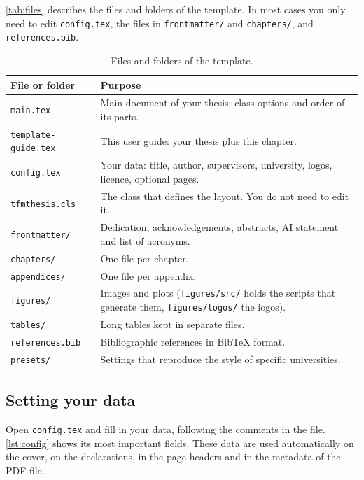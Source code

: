 \autoref{tab:files} describes the files and folders of the template. In most cases you only
need to edit \texttt{config.tex}, the files in \texttt{frontmatter/} and \texttt{chapters/},
and \texttt{references.bib}.

\begin{table}[ht!]
  \centering
  \small
  \caption{Files and folders of the template.}
  \label{tab:files}
  \begin{tabular}{@{}l p{10.6cm}@{}}
    \toprule
    \textbf{File or folder} & \textbf{Purpose} \\
    \midrule
    \texttt{main.tex}           & \raggedright Main document of your thesis: class options and order of
                                  its parts. \tabularnewline
    \texttt{template-guide.tex} & \raggedright This user guide: your thesis plus this chapter. \tabularnewline
    \texttt{config.tex}         & \raggedright Your data: title, author, supervisors, university, logos,
                                  licence, optional pages. \tabularnewline
    \texttt{tfmthesis.cls}      & \raggedright The class that defines the layout. You do not need to
                                  edit it. \tabularnewline
    \texttt{frontmatter/}       & \raggedright Dedication, acknowledgements, abstracts, AI statement and
                                  list of acronyms. \tabularnewline
    \texttt{chapters/}          & \raggedright One file per chapter. \tabularnewline
    \texttt{appendices/}        & \raggedright One file per appendix. \tabularnewline
    \texttt{figures/}           & \raggedright Images and plots (\texttt{figures/src/} holds the scripts
                                  that generate them, \texttt{figures/logos/} the logos). \tabularnewline
    \texttt{tables/}            & \raggedright Long tables kept in separate files. \tabularnewline
    \texttt{references.bib}     & \raggedright Bibliographic references in BibTeX format. \tabularnewline
    \texttt{presets/}           & \raggedright Settings that reproduce the style of specific
                                  universities. \tabularnewline
    \bottomrule
  \end{tabular}
\end{table}

\subsection{Setting your data}\label{sec:config}

Open \texttt{config.tex} and fill in your data, following the comments in the file.
\autoref{lst:config} shows its most important fields. These data are used automatically on
the cover, on the declarations, in the page headers and in the metadata of the PDF file.

